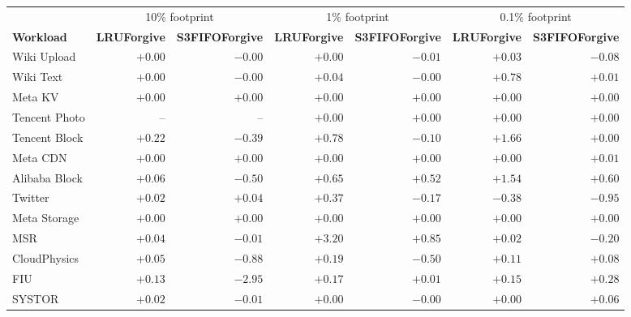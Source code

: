 \begin{tabular}{lrrrrrr}
\toprule
 & \multicolumn{2}{c}{10\% footprint} & \multicolumn{2}{c}{1\% footprint} & \multicolumn{2}{c}{0.1\% footprint} \\
\cmidrule(lr){2-3}\cmidrule(lr){4-5}\cmidrule(lr){6-7}
\textbf{Workload} & \textbf{LRUForgive} & \textbf{S3FIFOForgive} & \textbf{LRUForgive} & \textbf{S3FIFOForgive} & \textbf{LRUForgive} & \textbf{S3FIFOForgive} \\
\midrule
Wiki Upload & $+0.00$ & $-0.00$ & $+0.00$ & $-0.01$ & $+0.03$ & $-0.08$ \\
Wiki Text & $+0.00$ & $-0.00$ & $+0.04$ & $-0.00$ & $+0.78$ & $+0.01$ \\
Meta KV & $+0.00$ & $+0.00$ & $+0.00$ & $+0.00$ & $+0.00$ & $+0.00$ \\
Tencent Photo & -- & -- & $+0.00$ & $+0.00$ & $+0.00$ & $+0.00$ \\
Tencent Block & $+0.22$ & $-0.39$ & $+0.78$ & $-0.10$ & $+1.66$ & $+0.00$ \\
Meta CDN & $+0.00$ & $+0.00$ & $+0.00$ & $+0.00$ & $+0.00$ & $+0.01$ \\
Alibaba Block & $+0.06$ & $-0.50$ & $+0.65$ & $+0.52$ & $+1.54$ & $+0.60$ \\
Twitter & $+0.02$ & $+0.04$ & $+0.37$ & $-0.17$ & $-0.38$ & $-0.95$ \\
\midrule
Meta Storage & $+0.00$ & $+0.00$ & $+0.00$ & $+0.00$ & $+0.00$ & $+0.00$ \\
MSR & $+0.04$ & $-0.01$ & $+3.20$ & $+0.85$ & $+0.02$ & $-0.20$ \\
CloudPhysics & $+0.05$ & $-0.88$ & $+0.19$ & $-0.50$ & $+0.11$ & $+0.08$ \\
FIU & $+0.13$ & $-2.95$ & $+0.17$ & $+0.01$ & $+0.15$ & $+0.28$ \\
SYSTOR & $+0.02$ & $-0.01$ & $+0.00$ & $-0.00$ & $+0.00$ & $+0.06$ \\
\bottomrule
\end{tabular}
